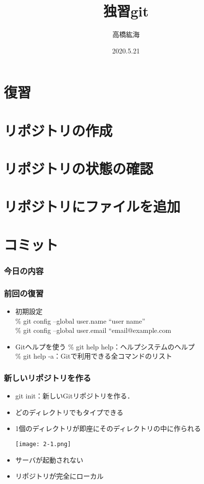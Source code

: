 \documentclass[dvipdfmx,11pt,notheorems]{beamer}
\title{独習git}
\author{高橋紘海}
\date{2020.5.21}
\begin{document}
\begin{frame} %
\titlepage %
\end{frame} %

\section{復習}
\section{リポジトリの作成}
\section{リポジトリの状態の確認}
\section{リポジトリにファイルを追加}
\section{コミット}
\begin{frame}
\frametitle{今日の内容}
\tableofcontents
\end{frame}

\begin{frame}
\frametitle{前回の復習}
\begin{itemize}
\item 初期設定\\
\% git config --global user.name ``user name''\\
\% git config --global user.email ``email@example.com\\
\item Gitヘルプを使う
\% git help help：ヘルプシステムのヘルプ\\
\% git help -a：Gitで利用できる全コマンドのリスト
\end{itemize}
\end{frame}

\begin{frame}
\frametitle{新しいリポジトリを作る}
\begin{itemize}
\item git init：新しいGitリポジトリを作る．
\item どのディレクトリでもタイプできる
\item 1個のディレクトリが即座にそのディレクトリの中に作られる
\begin{center}
\texttt{[image: 2-1.png]}
\end{center}
\item サーバが起動されない
\item リポジトリが完全にローカル
\end{itemize}
\end{frame}
\end{document}
